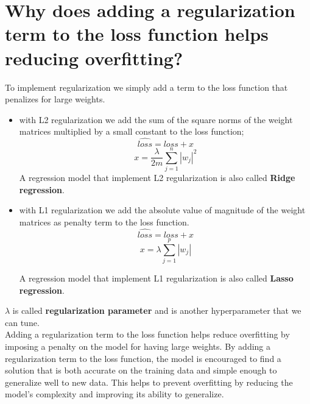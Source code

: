 \documentclass{article}
\begin{document}
\newpage

\section*{Why does adding a regularization term to the loss function helps reducing overfitting?}

To implement regularization we simply add a term to the loss function that penalizes for large weights. 

\begin{itemize}
    \item with L2 regularization we add the sum of the square norms of the weight matrices multiplied by a small constant to the loss function;
    \begin{equation*}
        \hat{loss} = loss + x        
    \end{equation*}
    \begin{equation*}
        x = \frac{\lambda}{2m}\sum_{j=1}^n |w_j|^2
    \end{equation*}
    A regression model that implement L2 regularization is also called \textbf{Ridge regression}.
    \item with L1 regularization we add the absolute value of magnitude of the weight matrices as penalty term to the loss function.
    \begin{equation*}
        \hat{loss} = loss + x        
    \end{equation*}
    \begin{equation*}
        x = \lambda \sum_{j=1}^p |w_j|
    \end{equation*}
    
    A regression model that implement L1 regularization is also called \textbf{Lasso regression}.
\end{itemize}

$\lambda$ is called \textbf{regularization parameter} and is another hyperparameter that we can tune.\\

Adding a regularization term to the loss function helps reduce overfitting by imposing a penalty on the model for having large weights. By adding a regularization term to the loss function, the model is encouraged to find a solution that is both accurate on the training data and simple enough to generalize well to new data. This helps to prevent overfitting by reducing the model's complexity and improving its ability to generalize.

\newpage
\end{document}
